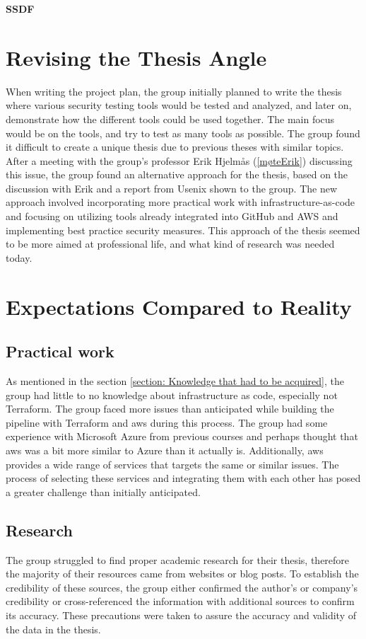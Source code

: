 \textbf{SSDF}



\section{Revising the Thesis Angle}
When writing the project plan, the group initially planned to write the thesis where various security testing tools would be tested and analyzed, and later on, demonstrate how the different tools could be used together. The main focus would be on the tools, and try to test as many tools as possible. The group found it difficult to create a unique thesis due to previous theses with similar topics. 
\\
After a meeting with the group's professor Erik Hjelmås  (\ref{møteErik}) discussing this issue, the group found an alternative approach for the thesis, based on the discussion with Erik and a report from Usenix \cite{usenixreport} shown to the group. The new approach involved incorporating more practical work with infrastructure-as-code and focusing on utilizing tools already integrated into GitHub and AWS and implementing best practice security measures. This approach of the thesis seemed to be more aimed at professional life, and what kind of research was needed today.  


\section{Expectations Compared to Reality}
\subsection{Practical work}
As mentioned in the section \ref{section: Knowledge that had to be acquired}, the group had little to no knowledge about \gls{infrastructure as code}, especially not Terraform. The group faced more issues than anticipated while building the pipeline with Terraform and \acrshort{aws} during this process.
The group had some experience with Microsoft Azure from previous courses and perhaps thought that \acrshort{aws} was a bit more similar to Azure than it actually is. Additionally, \acrshort{aws} provides a wide range of services that targets the same or similar issues. The process of selecting these services and integrating them with each other has posed a greater challenge than initially anticipated. 


\subsection{Research}
The group struggled to find proper academic research for their thesis, therefore the majority of their resources came from websites or blog posts. To establish the credibility of these sources, the group either confirmed the author's or company's credibility or cross-referenced the information with additional sources to confirm its accuracy. These precautions were taken to assure the accuracy and validity of the data in the thesis.


